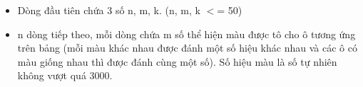\begin{itemize}
	\item Dòng đầu tiên chứa    3 số n, m, k. (n, m, k $<$= 50)
	\item n dòng tiếp theo, mỗi    dòng chứa m số thể hiện màu được tô cho ô tương ứng    trên bảng (mỗi màu khác nhau được đánh một số hiệu    khác nhau và các ô có màu giống nhau thì được đánh cùng    một số). Số hiệu màu là số tự nhiên không vượt quá    3000.
\end{itemize}